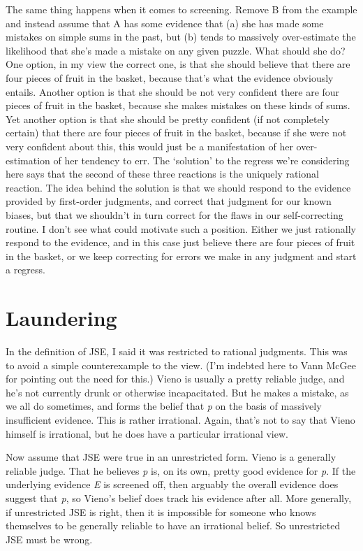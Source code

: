 The same thing happens when it comes to screening. Remove B from the example and instead assume that A has some evidence that (a) she has made some mistakes on simple sums in the past, but (b) tends to massively over-estimate the likelihood that she's made a mistake on any given puzzle. What should she do? One option, in my view the correct one, is that she should believe that there are four pieces of fruit in the basket, because that's what the evidence obviously entails. Another option is that she should be not very confident there are four pieces of fruit in the basket, because she makes mistakes on these kinds of sums. Yet another option is that she should be pretty confident (if not completely certain) that there are four pieces of fruit in the basket, because if she were not very confident about this, this would just be a manifestation of her over-estimation of her tendency to err. The `solution' to the regress we're considering here says that the second of these three reactions is the uniquely rational reaction. The idea behind the solution is that we should respond to the evidence provided by first-order judgments, and correct that judgment for our known biases, but that we shouldn't in turn correct for the flaws in our self-correcting routine. I don't see what could motivate such a position. Either we just rationally respond to the evidence, and in this case just believe there are four pieces of fruit in the basket, or we keep correcting for errors we make in any judgment and start a regress.

\section{Laundering}
\label{laundering}

In the definition of JSE, I said it was restricted to rational judgments. This was to avoid a simple counterexample to the view. (I'm indebted here to Vann McGee for pointing out the need for this.) \gls{Vieno} is usually a pretty reliable judge, and he's not currently drunk or otherwise incapacitated. But he makes a mistake, as we all do sometimes, and forms the belief that \emph{p} on the basis of massively insufficient evidence. This is rather irrational. Again, that's not to say that \gls{Vieno} himself is irrational, but he does have a particular irrational view.

Now assume that JSE were true in an unrestricted form. \gls{Vieno} is a generally reliable judge. That he believes \emph{p} is, on its own, pretty good evidence for \emph{p}. If the underlying evidence \emph{E} is screened off, then arguably the overall evidence does suggest that \emph{p}, so \gls{Vieno}'s belief does track his evidence after all. More generally, if unrestricted JSE is right, then it is impossible for someone who knows themselves to be generally reliable to have an irrational belief. So unrestricted JSE must be wrong.

